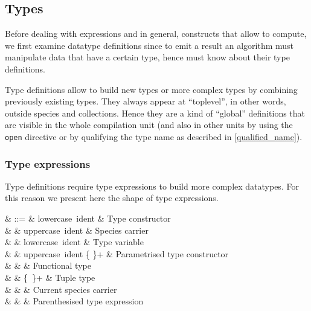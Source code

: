 \subsection{Types}
Before dealing with expressions and in general, constructs that allow
to compute, we first examine datatype definitions since to emit a
result an algorithm must manipulate data that have a certain type,
hence must know about their type definitions.

Type definitions allow to build new types or more complex types by
combining previously existing types. They always appear at
``toplevel'', in other words, outside species and collections. Hence
they are a kind of ``global'' definitions that are visible in the
whole compilation unit (and also in other units by using the
{\tt open} directive or by qualifying the type name as described in
\ref{qualified_name}).



\subsubsection{Type expressions}
Type definitions require type expressions to build more complex
datatypes. For this reason we present here the shape of type
expressions.

\vspace{0.2cm}
\begin{syntax}
\tau & ::= & lowercase\ ident   & Type constructor \\
     & \mid & uppercase\ ident & Species carrier \\
     & \mid & lowercase\ ident & Type variable \\
     & \mid & uppercase\ ident
              \terminal{(}\tau \{\terminal{,} \tau\}+\terminal{)} &
               Parametrised type constructor \\
     & \mid & \tau \terminal{\rightarrow} \tau & Functional type \\
     & \mid & \terminal{(}\tau \terminal{*} \tau \{\terminal{*}\ \tau\}+\terminal{)} &
               Tuple type \\
     & \mid &  & Current species carrier \\
     & \mid & \terminal{(}\tau\terminal{)} & Parenthesised type expression
\end{syntax}
\vspace{0.2cm}

